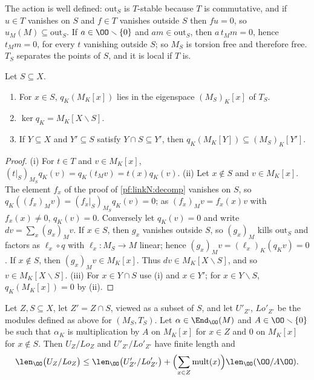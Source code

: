 The action is well defined: $\mathrm{out}_S$ is $T$-stable because $T$ is commutative, and if $u\in T$ vanishes on $S$ and
$f\in T$ vanishes outside $S$ then $fu=0$, so $u_M(M)\subseteq\mathrm{out}_S$. If $a\in\OO\smallsetminus\{0\}$ and
$am\in\mathrm{out}_S$, then $a\,t_Mm=0$, hence $t_Mm=0$, for every $t$ vanishing outside $S$; so $M_S$ is torsion free and
therefore free. $T_S$ separates the points of $S$, and it is local if $T$ is.

\begin{lemma}\label{pf:linkN:qK}
Let $S\subseteq X$.
\begin{enumerate}[label=(\roman*)]
\item For $x\in S$, $q_K(M_K[x])$ lies in the eigenspace $(M_S)_K[x]$ of $T_S$.
\item $\ker q_K=M_K[X\smallsetminus S]$.
\item If $Y\subseteq X$ and $Y'\subseteq S$ satisfy $Y\cap S\subseteq Y'$, then $q_K(M_K[Y])\subseteq(M_S)_K[Y']$.
\end{enumerate}
\end{lemma}

\begin{proof}
(i) For $t\in T$ and $v\in M_K[x]$, $(t|_S)_{M_S}q_K(v)=q_K(t_Mv)=t(x)q_K(v)$.
(ii) Let $x\notin S$ and $v\in M_K[x]$. The element $f_x$ of the proof of \cref{pf:linkN:decomp} vanishes on $S$, so
$q_K((f_x)_Mv)=(f_x|_S)_{M_S}q_K(v)=0$; as $(f_x)_Mv=f_x(x)v$ with $f_x(x)\ne0$, $q_K(v)=0$. Conversely let $q_K(v)=0$ and
write $dv=\sum_x(g_x)_Mv$. If $x\in S$, then $g_x$ vanishes outside $S$, so $(g_x)_M$ kills $\mathrm{out}_S$ and factors as
$\ell_x\circ q$ with $\ell_x:M_S\to M$ linear; hence $(g_x)_Mv=(\ell_x)_K(q_Kv)=0$. If $x\notin S$, then $(g_x)_Mv\in M_K[x]$.
Thus $dv\in M_K[X\smallsetminus S]$, and so $v\in M_K[X\smallsetminus S]$.
(iii) For $x\in Y\cap S$ use (i) and $x\in Y'$; for $x\in Y\smallsetminus S$, $q_K(M_K[x])=0$ by (ii).
\end{proof}

\begin{lemma}\label{pf:linkN:lengthle}
Let $Z,S\subseteq X$, let $Z'=Z\cap S$, viewed as a subset of $S$, and let $U'_{Z'}$, $\mathit{Lo}'_{Z'}$ be the modules
defined as above for $(M_S,T_S)$. Let $\alpha\in\End_\OO(M)$ and $A\in\OO\smallsetminus\{0\}$ be such that $\alpha_K$ is
multiplication by $A$ on $M_K[x]$ for $x\in Z$ and $0$ on $M_K[x]$ for $x\notin S$. Then $U_Z/\mathit{Lo}_Z$ and
$U'_{Z'}/\mathit{Lo}'_{Z'}$ have finite length and
\[
\len_\OO\bigl(U_Z/\mathit{Lo}_Z\bigr)\le\len_\OO\bigl(U'_{Z'}/\mathit{Lo}'_{Z'}\bigr)
+\Bigl(\sum_{x\in Z}\linkNmult(x)\Bigr)\len_\OO(\OO/A\OO).
\]
\end{lemma}

